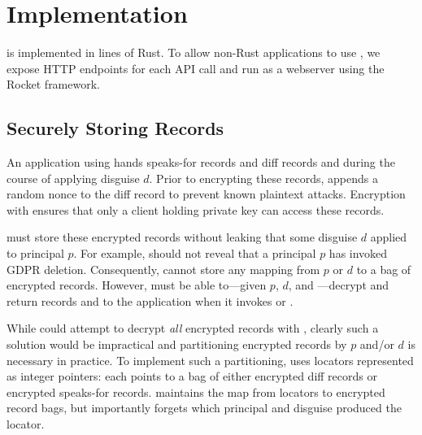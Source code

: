 \section{Implementation}

\sys is implemented in  lines of Rust. To allow non-Rust applications to use \sys, we
expose HTTP endpoints for each \sys API call and run \sys as a webserver using the Rocket framework.

\subsection{Securely Storing Records}
%
An application using \sys hands \sys speaks-for records  and diff records and 
during the course of applying disguise $d$.
%
Prior to encrypting these records, \sys appends a random nonce to the diff record to prevent known
plaintext attacks. Encryption with  ensures that only a client holding private key 
can access these records.

\sys must store these encrypted records without leaking that some disguise $d$ applied to principal
$p$.  For example, \sys should not reveal that a principal $p$ has invoked GDPR deletion.
%
Consequently, \sys cannot store any mapping from $p$ or $d$ to a bag of encrypted records.  However,
\sys must be able to---given $p$, $d$, and ---decrypt and return records  and
 to the application when it invokes  or .

While \sys could attempt to decrypt \emph{all} encrypted records with ,
clearly such a solution would be impractical and partitioning encrypted records by $p$ and/or $d$ is
necessary in practice.  To implement such a partitioning, \sys uses locators  represented
as integer pointers: each  points to a bag of either encrypted diff records or encrypted
speaks-for records. \sys maintains the map from locators to encrypted record bags, but importantly
forgets which principal and disguise produced the locator.


